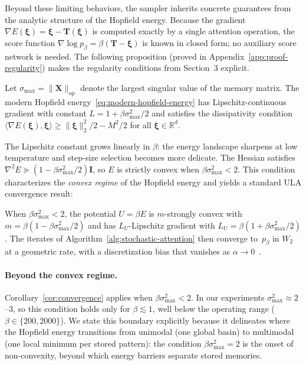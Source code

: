 Beyond these limiting behaviors, the sampler inherits concrete guarantees from the analytic structure of the Hopfield energy. Because the gradient $\nabla E(\boldsymbol{\xi})=\boldsymbol{\xi}-\mathbf{T}(\boldsymbol{\xi})$ is computed exactly by a single attention operation, the score function $\nabla\log p_\beta = \beta(\mathbf{T}-\boldsymbol{\xi})$ is known in closed form; no auxiliary score network is needed. The following proposition (proved in Appendix~\ref{app:proof-regularity}) makes the regularity conditions from Section~3 explicit.

\begin{proposition}\label{prop:regularity}
Let $\sigma_{\max}=\|\mathbf{X}\|_{\mathrm{op}}$ denote the largest singular value of the memory matrix. The modern Hopfield energy~\eqref{eq:modern-hopfield-energy} has Lipschitz-continuous gradient with constant $L = 1 + \beta\sigma_{\max}^{2}/2$ and satisfies the dissipativity condition $\langle \nabla E(\boldsymbol{\xi}),\boldsymbol{\xi}\rangle \ge \|\boldsymbol{\xi}\|_2^2/2 - M^2/2$ for all $\boldsymbol{\xi}\in\mathbb{R}^d$.
\end{proposition}

The Lipschitz constant grows linearly in $\beta$: the energy landscape sharpens at low temperature and step-size selection becomes more delicate. The Hessian satisfies $\nabla^2 E \succeq (1-\beta\sigma_{\max}^{2}/2)\mathbf{I}$, so $E$ is strictly convex when $\beta\sigma_{\max}^{2}<2$. This condition characterizes the \emph{convex regime} of the Hopfield energy and yields a standard ULA convergence result:

\begin{corollary}\label{cor:convergence}
When $\beta\sigma_{\max}^{2}<2$, the potential $U=\beta E$ is $m$-strongly convex with $m=\beta(1-\beta\sigma_{\max}^{2}/2)$ and has $L_{U}$-Lipschitz gradient with $L_{U}=\beta(1+\beta\sigma_{\max}^{2}/2)$. The iterates of Algorithm~\ref{alg:stochastic-attention} then converge to~$p_\beta$ in $W_2$ at a geometric rate, with a discretization bias that vanishes as $\alpha\to 0$~\cite{dalalyanTheoreticalGuaranteesApproximate2017,durmusNonasymptoticAnalysisUnadjusted2017}.
\end{corollary}

\paragraph{Beyond the convex regime.}
Corollary~\ref{cor:convergence} applies when $\beta\sigma_{\max}^{2}<2$. In our experiments $\sigma_{\max}^{2}\approx 2$--$3$, so this condition holds only for $\beta\lesssim 1$, well below the operating range ($\beta\in\{200,2000\}$). We state this boundary explicitly because it delineates where the Hopfield energy transitions from unimodal (one global basin) to multimodal (one local minimum per stored pattern): the condition $\beta\sigma_{\max}^{2}=2$ is the onset of non-convexity, beyond which energy barriers separate stored memories.

